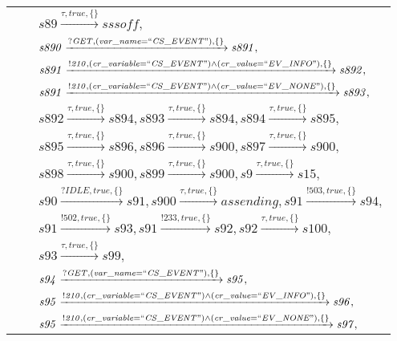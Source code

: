 \begin{tabular}{lcp{350px}}
& & $\mathit{s89}\xrightarrow{\mathit{\tau}, \mathit{true}, \{\}}\mathit{sssoff},$ \\
& & $\mathit{s890}\xrightarrow{\mathit{?GET}, \mathit{(var\_name = ``CS\_EVENT")}, \{\}}\mathit{s891},$ \\
& & $\mathit{s891}\xrightarrow{\mathit{!210}, \mathit{(cr\_variable = ``CS\_EVENT") \land (cr\_value = ``EV\_INFO")}, \{\}}\mathit{s892},$ \\
& & $\mathit{s891}\xrightarrow{\mathit{!210}, \mathit{(cr\_variable = ``CS\_EVENT") \land (cr\_value = ``EV\_NONE")}, \{\}}\mathit{s893},$ \\
& & $\mathit{s892}\xrightarrow{\mathit{\tau}, \mathit{true}, \{\}}\mathit{s894},\mathit{s893}\xrightarrow{\mathit{\tau}, \mathit{true}, \{\}}\mathit{s894},\mathit{s894}\xrightarrow{\mathit{\tau}, \mathit{true}, \{\}}\mathit{s895},$ \\
& & $\mathit{s895}\xrightarrow{\mathit{\tau}, \mathit{true}, \{\}}\mathit{s896},\mathit{s896}\xrightarrow{\mathit{\tau}, \mathit{true}, \{\}}\mathit{s900},\mathit{s897}\xrightarrow{\mathit{\tau}, \mathit{true}, \{\}}\mathit{s900},$ \\
& & $\mathit{s898}\xrightarrow{\mathit{\tau}, \mathit{true}, \{\}}\mathit{s900},\mathit{s899}\xrightarrow{\mathit{\tau}, \mathit{true}, \{\}}\mathit{s900},\mathit{s9}\xrightarrow{\mathit{\tau}, \mathit{true}, \{\}}\mathit{s15},$ \\
& & $\mathit{s90}\xrightarrow{\mathit{?IDLE}, \mathit{true}, \{\}}\mathit{s91},\mathit{s900}\xrightarrow{\mathit{\tau}, \mathit{true}, \{\}}\mathit{assending},\mathit{s91}\xrightarrow{\mathit{!503}, \mathit{true}, \{\}}\mathit{s94},$ \\
& & $\mathit{s91}\xrightarrow{\mathit{!502}, \mathit{true}, \{\}}\mathit{s93},\mathit{s91}\xrightarrow{\mathit{!233}, \mathit{true}, \{\}}\mathit{s92},\mathit{s92}\xrightarrow{\mathit{\tau}, \mathit{true}, \{\}}\mathit{s100},$ \\
& & $\mathit{s93}\xrightarrow{\mathit{\tau}, \mathit{true}, \{\}}\mathit{s99},$ \\
& & $\mathit{s94}\xrightarrow{\mathit{?GET}, \mathit{(var\_name = ``CS\_EVENT")}, \{\}}\mathit{s95},$ \\
& & $\mathit{s95}\xrightarrow{\mathit{!210}, \mathit{(cr\_variable = ``CS\_EVENT") \land (cr\_value = ``EV\_INFO")}, \{\}}\mathit{s96},$ \\
& & $\mathit{s95}\xrightarrow{\mathit{!210}, \mathit{(cr\_variable = ``CS\_EVENT") \land (cr\_value = ``EV\_NONE")}, \{\}}\mathit{s97},$ \\

\end{tabular}
